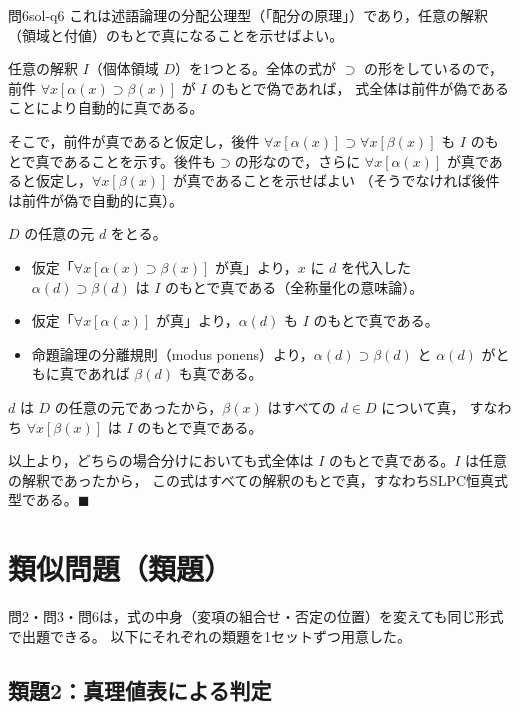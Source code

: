 \documentclass[autodetect-engine,dvi=dvipdfmx,ja=standard]{bxjsarticle}
\begin{document}
\begin{solution}{問6}{sol-q6}
これは述語論理の分配公理型（「配分の原理」）であり，任意の解釈（領域と付値）のもとで真になることを示せばよい。

任意の解釈 \(I\)（個体領域 \(D\)）を1つとる。全体の式が \(\supset\) の形をしているので，
前件 \(\forall x[\alpha(x)\supset\beta(x)]\) が \(I\) のもとで偽であれば，
式全体は前件が偽であることにより自動的に真である。

そこで，前件が真であると仮定し，後件 \(\forall x[\alpha(x)]\supset\forall x[\beta(x)]\) も
\(I\) のもとで真であることを示す。後件も\(\supset\)の形なので，さらに
\(\forall x[\alpha(x)]\) が真であると仮定し，\(\forall x[\beta(x)]\) が真であることを示せばよい
（そうでなければ後件は前件が偽で自動的に真）。

\(D\) の任意の元 \(d\) をとる。
\begin{itemize}
  \item 仮定「\(\forall x[\alpha(x)\supset\beta(x)]\) が真」より，\(x\) に \(d\) を代入した
    \(\alpha(d)\supset\beta(d)\) は \(I\) のもとで真である（全称量化の意味論）。
  \item 仮定「\(\forall x[\alpha(x)]\) が真」より，\(\alpha(d)\) も \(I\) のもとで真である。
  \item 命題論理の分離規則（modus ponens）より，\(\alpha(d)\supset\beta(d)\) と \(\alpha(d)\) がともに真であれば
    \(\beta(d)\) も真である。
\end{itemize}
\(d\) は \(D\) の任意の元であったから，\(\beta(x)\) はすべての \(d\in D\) について真，
すなわち \(\forall x[\beta(x)]\) は \(I\) のもとで真である。

以上より，どちらの場合分けにおいても式全体は \(I\) のもとで真である。\(I\) は任意の解釈であったから，
この式はすべての解釈のもとで真，すなわちSLPC恒真式型である。\hfill\(\blacksquare\)
\end{solution}

\section*{類似問題（類題）}

問2・問3・問6は，式の中身（変項の組合せ・否定の位置）を変えても同じ形式で出題できる。
以下にそれぞれの類題を1セットずつ用意した。

\subsection*{類題2：真理値表による判定}
\end{document}
